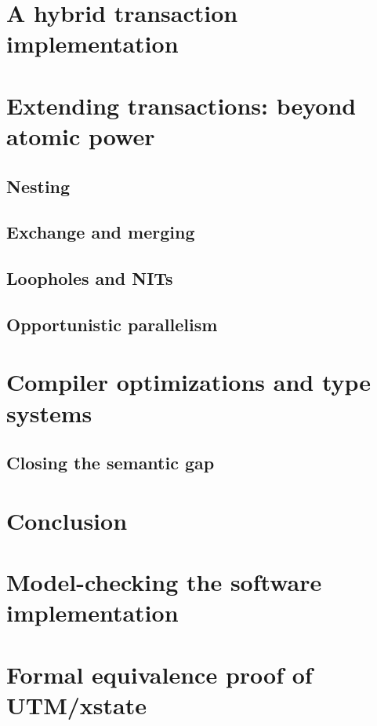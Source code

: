 \documentclass{phd-thesis}
\begin{document}


\chapter{A hybrid transaction implementation}\label{sec:hybrid}


\chapter[Extending transactions]{Extending transactions: beyond atomic power}

\section{Nesting}
\section{Exchange and merging}
\section{Loopholes and NITs}
\section{Opportunistic parallelism}

\chapter[Optimizations and type systems]{Compiler optimizations and type systems}
\section{Closing the semantic gap}\label{sec:safe-transactify}

\chapter{Conclusion}
\appendix
\chapter[Model-checking the implementation]{Model-checking the software implementation}\label{sec:full-model}


\chapter{Formal equivalence proof of UTM/xstate}\label{sec:hw-proof}


\backmatter

\printindex
\end{document}
